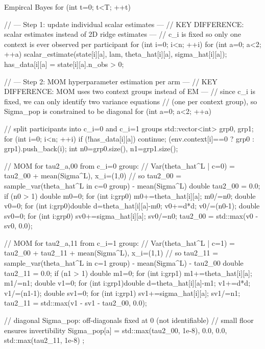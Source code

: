 \documentclass[letterpaper, 9pt]{extarticle}
\begin{document}
\begin{codechunk} {Empircal Bayes}
for (int t=0; t<T; ++t) {

    // --- Step 1: update individual scalar estimates ---
    // KEY DIFFERENCE: scalar estimates instead of 2D ridge estimates —
    // c_i is fixed so only one context is ever observed per participant
    for (int i=0; i<n; ++i) for (int a=0; a<2; ++a) {
        scalar_estimate(state[i][a], lam, theta_hat[i][a], sigma_hat[i][a]);
        has_data[i][a] = state[i][a].n_obs > 0;
    }

    // --- Step 2: MOM hyperparameter estimation per arm ---
    // KEY DIFFERENCE: MOM uses two context groups instead of EM —
    // since c_i is fixed, we can only identify two variance equations
    // (one per context group), so Sigma_pop is constrained to be diagonal
    for (int a=0; a<2; ++a) {
        // split participants into c_i=0 and c_i=1 groups
        std::vector<int> grp0, grp1;
        for (int i=0; i<n; ++i) {
            if (!has_data[i][a]) continue;
            (env.context[i]==0 ? grp0 : grp1).push_back(i);
        }
        int n0=grp0.size(), n1=grp1.size();

        // MOM for tau2_{a,00} from c_i=0 group:
        // Var(theta_hat^L | c=0) = tau2_00 + mean(Sigma^L),  x_i=(1,0)
        // so tau2_00 = sample_var(theta_hat^L in c=0 group) - mean(Sigma^L)
        double tau2_00 = 0.0;
        if (n0 > 1) {
            double m0=0; for (int i:grp0) m0+=theta_hat[i][a]; m0/=n0;
            double v0=0; for (int i:grp0){double d=theta_hat[i][a]-m0; v0+=d*d;} v0/=(n0-1);
            double sv0=0; for (int i:grp0) sv0+=sigma_hat[i][a]; sv0/=n0;
            tau2_00 = std::max(v0 - sv0, 0.0);
        }

        // MOM for tau2_{a,11} from c_i=1 group:
        // Var(theta_hat^L | c=1) = tau2_00 + tau2_11 + mean(Sigma^L),  x_i=(1,1)
        // so tau2_11 = sample_var(theta_hat^L in c=1 group) - mean(Sigma^L) - tau2_00
        double tau2_11 = 0.0;
        if (n1 > 1) {
            double m1=0; for (int i:grp1) m1+=theta_hat[i][a]; m1/=n1;
            double v1=0; for (int i:grp1){double d=theta_hat[i][a]-m1; v1+=d*d;} v1/=(n1-1);
            double sv1=0; for (int i:grp1) sv1+=sigma_hat[i][a]; sv1/=n1;
            tau2_11 = std::max(v1 - sv1 - tau2_00, 0.0);
        }

        // diagonal Sigma_pop: off-diagonals fixed at 0 (not identifiable)
        // small floor ensures invertibility
        Sigma_pop[a] = { std::max(tau2_00, 1e-8), 0.0,
                         0.0, std::max(tau2_11, 1e-8) };

}}
\end{codechunk}
\end{document}
